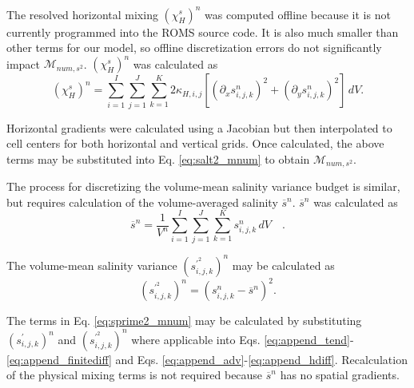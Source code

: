 The resolved horizontal mixing $(\chi_H^s)^n$ was computed offline because it is not currently programmed into the ROMS source code. It is also much smaller than other terms for our model, so offline discretization errors do not significantly impact $\mathcal{M}_{num, s^2}$.  $(\chi_H^s)^n$ was calculated as
\begin{equation} \label{eq:append_hmix}
        (\chi_H^s)^n = \sum_{i=1}^{I}\sum_{j=1}^{J}\sum_{k=1}^{K} 2\kappa_{H,i,j} \left[ \left(\partial_x s_{i,j,k}^n \right)^2+\left(\partial_y s_{i,j,k}^n \right)^2 \right]  \, dV.
\end{equation}

Horizontal gradients were calculated using a Jacobian but then interpolated to cell centers for both horizontal and vertical grids. Once calculated, the above terms may be substituted into Eq. \ref{eq:salt2_mnum} to obtain $\mathcal{M}_{num, s^2}$.

The process for discretizing the volume-mean salinity variance budget is similar, but requires calculation of the volume-averaged salinity $\overline{s}^n$. $\overline{s}^n$ was calculated as
\begin{equation}
        \overline{s}^n = \frac{1}{V^n} \sum_{i=1}^{I}\sum_{j=1}^{J}\sum_{k=1}^{K} s_{i,j,k}^n \, dV \quad .
\end{equation}

The volume-mean salinity variance $(s_{i,j,k}^{{\prime^2}})^n$ may be calculated as
\begin{equation}
        \left(s_{i,j,k}^{{\prime^2}} \right)^n = \left(s_{i,j,k}^n-\overline{s}^n \right)^2.
\end{equation}

The terms in Eq. \ref{eq:sprime2_mnum} may be calculated by substituting $(s_{i,j,k}^{\prime})^n$ and $(s_{i,j,k}^{\prime^2})^n$ where applicable into Eqs. \ref{eq:append_tend}-\ref{eq:append_finitediff} and Eqs. \ref{eq:append_adv}-\ref{eq:append_hdiff}. Recalculation of the physical mixing terms is not required because $\overline{s}^n$ has no spatial gradients.

\newpage
% 
% 

